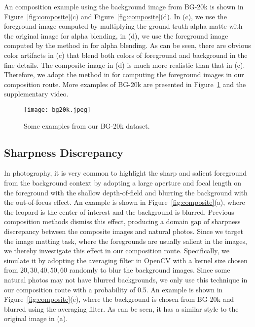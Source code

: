 \documentclass[twocolumn]{svjour3}
\begin{document}
An composition example using the background image from BG-20k is shown in Figure~\ref{fig:composite}(c) and Figure~\ref{fig:composite}(d). In (c), we use the foreground image computed by multiplying the ground truth alpha matte with the original image for alpha blending, in (d), we use the foreground image computed by the method in \citep{levin2007closed} for alpha blending. As can be seen, there are obvious color artifacts in (c) that blend both colors of foreground and background in the fine details. The composite image in (d) is much more realistic than that in (c). Therefore, we adopt the method in \citep{levin2007closed} for computing the foreground images in our composition route. More examples of BG-20k are presented in Figure~\ref{fig:bg20k_examples} and the supplementary video.

\begin{figure}[htbp]
    \centering
    \texttt{[image: bg20k.jpeg]}
     \caption{Some examples from our BG-20k dataset.}
    \label{fig:bg20k_examples}
\end{figure}

\subsection{Sharpness Discrepancy}

In photography, it is very common to highlight the sharp and salient foreground from the background context by adopting a large aperture and focal length on the foreground with the shallow depth-of-field and blurring the background with the out-of-focus effect. An example is shown in Figure~\ref{fig:composite}(a), where the leopard is the center of interest and the background is blurred. Previous composition methods dismiss this effect, producing a domain gap of sharpness discrepancy between the composite images and natural photos. Since we target the image matting task, where the foregrounds are usually salient in the images, we thereby investigate this effect in our composition route. Specifically, we simulate it by adopting the averaging filter in OpenCV with a kernel size chosen from ${20,30,40,50,60}$ randomly to blur the background images. Since some natural photos may not have blurred backgrounds, we only use this technique in our composition route with a probability of 0.5. An example is shown in Figure~\ref{fig:composite}(e), where the background is chosen from BG-20k and blurred using the averaging filter. As can be seen, it has a similar style to the original image in (a).
\end{document}
